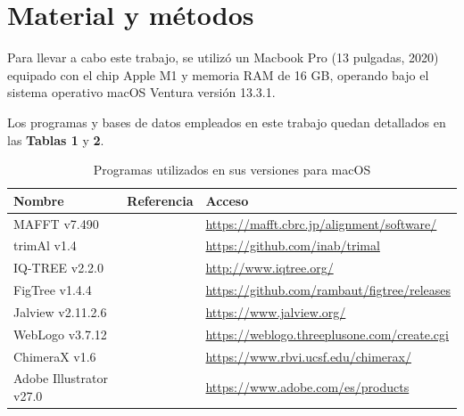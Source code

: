 \section{Material y métodos}

Para llevar a cabo este trabajo, se utilizó un Macbook Pro (13 pulgadas, 
2020) equipado con el chip Apple M1 y memoria RAM de 16 GB, operando bajo el
sistema operativo macOS Ventura versión 13.3.1.

Los programas y bases de datos empleados en este trabajo quedan detallados 
en las \textbf{Tablas 1} y \textbf{2}.

\begin{table}[htbp]
    \centering
    \caption{Programas utilizados en sus versiones para macOS}\label{tab:programs}
    \scriptsize
    \setlength{\tabcolsep}{20pt}
    \begin{tabularx}{\textwidth}{@{}p{3cm}p{3cm}X@{}}
    \toprule
    \textbf{Nombre} & \textbf{Referencia} & \textbf{Acceso} \\ 
    \midrule
    MAFFT v7.490 & \cite{katoh_mafft_2013} & \url{https://mafft.cbrc.jp/alignment/software/} \\
    trimAl v1.4 & \cite{capella-gutierrez_trimal_2009} & \url{https://github.com/inab/trimal} \\
    IQ-TREE v2.2.0 & \cite{minh_iq-tree_2020} & \url{http://www.iqtree.org/} \\
    FigTree v1.4.4 & \cite{rambaut_figtree_2007} & \url{https://github.com/rambaut/figtree/releases} \\
    Jalview v2.11.2.6 & \cite{waterhouse_jalview_2009} & \url{https://www.jalview.org/} \\
    WebLogo v3.7.12 & \cite{crooks_weblogo_2004} & \url{https://weblogo.threeplusone.com/create.cgi} \\
    ChimeraX v1.6 & \cite{pettersen_span_2021} & \url{https://www.rbvi.ucsf.edu/chimerax/} \\
    Adobe Illustrator v27.0 & \cite{adobe_inc_adobe_2023} & \url{https://www.adobe.com/es/products} \\ 
    \bottomrule
    \end{tabularx}
\end{table}

